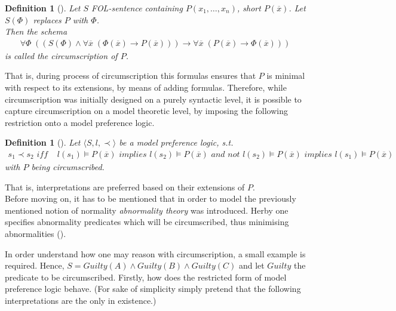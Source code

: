 \documentclass{extarticle}
\newtheorem{mydef}[thm]{Definition}
\begin{document}
\begin{mydef}[\cite{mccarthy1981circumscription}]
Let $S$ FOL-sentence containing $P(x_1, \dots, x_n)$, short $P(\overline{x})$. Let $S(\Phi)$ replaces $P$ with $\Phi$. \\
Then the schema
\begin{equation*}
\begin{split}
\forall \Phi \; ((S(\Phi) \wedge  \forall \overline{x} \; (\Phi(\overline{x})\to P(\overline{x}))) \to \forall \overline{x} \; (P(\overline{x}) \to \Phi(\overline{x})))
\end{split}
\end{equation*}
is called the circumscription of $P$.
\end{mydef} 
That is, during process of circumscription this formulas ensures that $P$ is minimal with respect to its extensions, by means of adding formulas. Therefore, while circumscription was initially designed on a purely syntactic level, it is possible to capture circumscription on a model theoretic level, by imposing the following restriction onto a model preference logic. 
\begin{mydef}[\cite{brewka1997nonmonotonic}]
Let $\langle S,l, \prec \rangle$ be a model preference logic, s.t. 
\begin{equation*}
\begin{split}
s_1 \prec s_2  \textit{  iff  } &l(s_1) \models P(\overline{x}) \textit{  implies  } l(s_2) \models P(\overline{x}) \textit{ and not } l(s_2) \models P(\overline{x}) \textit{ implies } l(s_1) \models P(\overline{x})
\end{split}
\end{equation*}
with $P$ being circumscribed.
\end{mydef} 
That is, interpretations are preferred based on their extensions of $P$.\\

Before moving on, it has to be mentioned that in order to model the previously mentioned notion of normality \emph{abnormality theory} was introduced. Herby one specifies abnormality predicates which will be circumscribed, thus minimising abnormalities (\cite{mccarthy1981circumscription}).

In order understand how one may reason with circumscription, a small example is required.
Hence, $S = Guilty(A) \wedge Guilty(B) \wedge Guilty(C)$ and let $Guilty$ the predicate to be circumscribed. 
Firstly, how does the restricted form of model preference logic behave. (For sake of simplicity simply pretend that the following interpretations are the only in existence.)  \\
\end{document}
